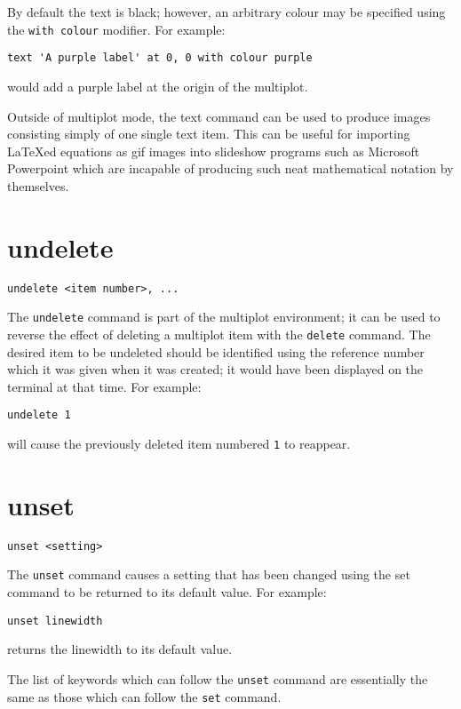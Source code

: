 By default the text is black; however, an arbitrary colour may be specified
using the {\tt with colour} modifier.  For example:

\begin{verbatim}
text 'A purple label' at 0, 0 with colour purple
\end{verbatim}

\noindent would add a purple label at the origin of the multiplot.

Outside of multiplot mode, the text command can be used to produce images
consisting simply of one single text item. This can be useful for importing
\LaTeX ed equations as gif images into slideshow programs such as Microsoft
Powerpoint which are incapable of producing such neat mathematical notation
by themselves.

\section{undelete}

\begin{verbatim}
undelete <item number>, ...
\end{verbatim}

The {\tt undelete} command is part of the multiplot environment; it can be used
to reverse the effect of deleting a multiplot item with the {\tt delete}
command. The desired item to be undeleted should be identified using the
reference number which it was given when it was created; it would have been
displayed on the terminal at that time. For example:

\begin{verbatim}
undelete 1
\end{verbatim}

\noindent will cause the previously deleted item numbered {\tt 1} to reappear.
  
\section{unset}

\begin{verbatim}
unset <setting>
\end{verbatim}

The {\tt unset} command causes a setting that has been changed using the set
command to be returned to its default value.  For example:

\begin{verbatim}
unset linewidth
\end{verbatim}

\noindent returns the linewidth to its default value.

The list of keywords which can follow the {\tt unset} command are essentially
the same as those which can follow the {\tt set} command.
